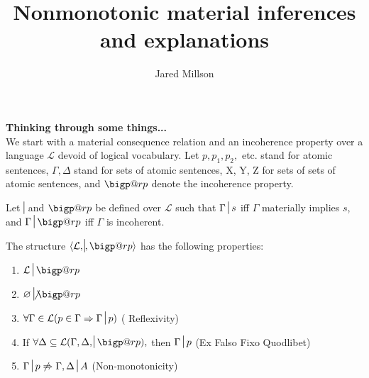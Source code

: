 \documentclass{article}
\title{Nonmonotonic material inferences and explanations}
\author{Jared Millson}
\date{}
\makeatletter
\newcommand{\bigperp}{%
  \mathop{\mathpalette\bigp@rp\relax}%
  \displaylimits
}
\newcommand{\bigp@rp}[2]{%
  \vcenter{
    \m@th\hbox{\scalebox{\ifx#1\displaystyle2.1\else1.5\fi}{$#1\perp$}}
  }%
}
\newcommand{\nc}{\turnstile{s}{w}{}{}{n}}
\makeatother
\begin{document}
\maketitle
\setlength{\parindent}{1cm}
\large

\textbf{{\Large Thinking through some things...}}\\

We start with a material consequence relation and an incoherence property over a language $ \mathcal{L} $ devoid of logical vocabulary. Let $ p, p_1, p_2, $ etc. stand for atomic sentences, $ \Gamma, \Delta $ stand for sets of atomic sentences, X, Y, Z for sets of sets of atomic sentences, and $ \bigperp $ denote the incoherence property. 

Let $ \nc $ and $ \bigperp $ be defined over $ \mathcal{L} $ such that $  \Gamma\nc s $ iff  $\Gamma$ materially implies $ s $, and $\Gamma\nc \bigperp $ iff $ \Gamma $ is incoherent. 

The structure  $ \langle \mathcal{L}, \nc, \bigperp \rangle  $ has the following properties: 
\begin{enumerate}
\item $  \mathcal{L}\nc\bigperp$
\item $ \varnothing\not\nc\bigperp $
\item $\forall \Gamma\in\mathcal{L} (p \in \Gamma \Rightarrow \Gamma\nc p)$ ( Reflexivity)
\item  If $ \forall\Delta\subseteq\mathcal{L}(\Gamma, \Delta, \nc\bigperp),$  then  $\Gamma\nc p $ (Ex Falso Fixo Quodlibet)
\item $\Gamma\nc p \not\Rightarrow \Gamma, \Delta \nc A$ (Non-monotonicity)
\end{enumerate}
\end{document}
